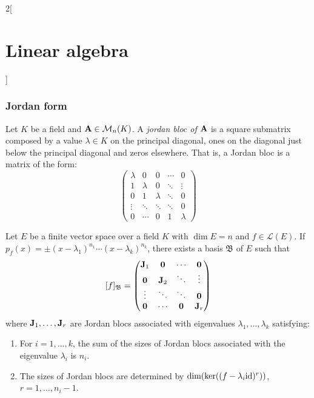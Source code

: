 \documentclass[../../../main.tex]{subfiles}
\begin{document}
\begin{multicols}{2}[\section{Linear algebra}]
\subsubsection*{Jordan form}
\begin{definition}
    Let $K$ be a field and $\vb{A}\in\mathcal{M}_n(K)$. A \textit{jordan bloc of $\vb{A}$} is a square submatrix composed by a value $\lambda\in K$ on the principal diagonal, ones on the diagonal just below the principal diagonal and zeros elsewhere. That is, a Jordan bloc is a matrix of the form: 
    $$
    \begin{pmatrix}
        \lambda & 0 & 0 & \cdots & 0 \\
        1 & \lambda & 0 & \ddots & \vdots \\
        0 & 1 & \lambda & \ddots & 0 \\
        \vdots & \ddots &\ddots & \ddots & 0 \\
        0 & \cdots & 0 & 1 & \lambda   
    \end{pmatrix}
    $$
\end{definition}
\begin{prop}
    Let $E$ be a finite vector space over a field $K$ with $\dim E=n$ and $f\in\mathcal{L}(E)$. If $p_f(x)=\pm(x-\lambda_1)^{n_1}\cdots(x-\lambda_k)^{n_k}$, there exists a basis $\mathfrak{B}$ of $E$ such that
    $$[f]_{\mathfrak{B}}=
    \begin{pmatrix}
        \vb{J}_1 & \vb{0} & \cdots & \vb{0} \\
        \vb{0} & \vb{J}_2 & \ddots & \vdots \\
        \vdots & \ddots & \ddots & \vb{0} \\
        \vb{0} & \cdots & \vb{0} & \vb{J}_r \\
    \end{pmatrix}
    $$
    where $\vb{J}_1,\ldots,\vb{J}_r$ are Jordan blocs associated with eigenvalues $\lambda_1,\ldots,\lambda_k$ satisfying:
    \begin{enumerate}
        \item\label{LA_diag1} For $i=1,\ldots,k$, the sum of the sizes of Jordan blocs associated with the eigenvalue $\lambda_i$ is $n_i$.
        \item\label{LA_diag2} The sizes of Jordan blocs are determined by $\dim(\ker((f-\lambda_i\mathrm{id})^r))$, $r=1,\ldots,n_i-1$.
    \end{enumerate}
\end{prop}

\end{multicols}
\end{document}
